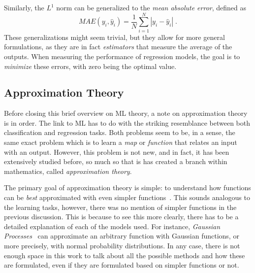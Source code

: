 Similarly, the $L^1$ norm can be generalized to the \emph{mean absolute error}, defined as
\begin{equation}
    MAE \left( y_i, \hat{y}_i \right) = \frac{1}{N} \sum_{i=1}^{N} \left\lvert y_i - \hat{y}_i \right\rvert
    \; .
    \label{eq:mae}
\end{equation}
These generalizations might seem trivial, but they allow for more general formulations, as 
they are in fact \emph{estimators} that measure the average of the outputs. When measuring 
the performance of regression models, the goal is to \emph{minimize} these errors, with 
zero being the optimal value.

\subsection{Approximation Theory}
Before closing this brief overview on ML theory, a note on approximation theory is in 
order. The link to ML has to do with the striking resemblance between both classification 
and regression tasks. Both problems seem to be, in a sense, the same exact problem which is to learn a \emph{map} or \emph{function} that relates an input with an output. However, this problem is not 
new, and in fact, it has been extensively studied before, so much so that is has created a 
branch within mathematics, called \emph{approximation theory}.

The primary goal of approximation theory is simple: to understand how functions can be \emph{best} approximated with even simpler functions~\cite{trefethenApproximationTheoryApproximation2013}. This sounds analogous to the learning tasks, however, there was no mention of simpler functions in the previous discussion. This is because to see this more clearly, there has to be a detailed explanation of each of the models used. For instance, \emph{Gaussian Processes}~\cite{rasmussenGaussianProcessesMachine2006} can approximate an arbitrary function with Gaussian functions, or more precisely, with normal probability distributions. In any case, there is not enough space in this work to talk about all the possible methods and how these are formulated, even if they are formulated based on simpler functions or not.

